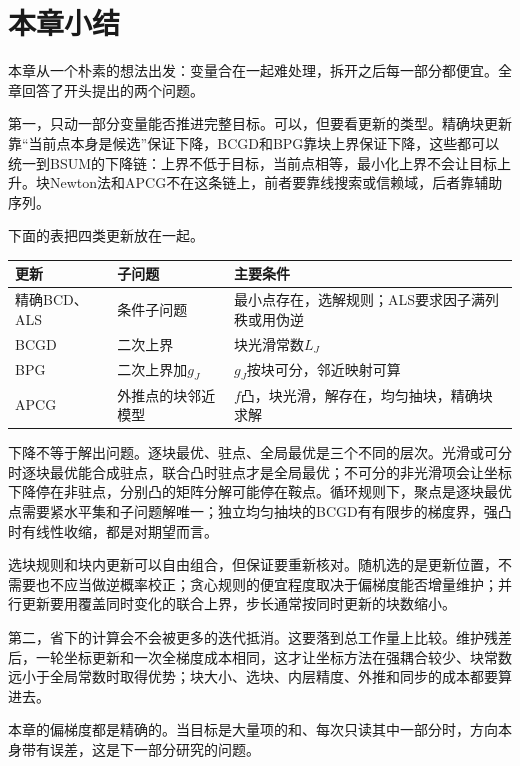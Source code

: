 \section{本章小结}
\label{sec:block-summary}

本章从一个朴素的想法出发：变量合在一起难处理，拆开之后每一部分都便宜。全章回答了开头提出的两个问题。

第一，只动一部分变量能否推进完整目标。可以，但要看更新的类型。精确块更新靠“当前点本身是候选”保证下降，BCGD和BPG靠块上界保证下降，这些都可以统一到BSUM的下降链：上界不低于目标，当前点相等，最小化上界不会让目标上升。块Newton法和APCG不在这条链上，前者要靠线搜索或信赖域，后者靠辅助序列。

下面的表把四类更新放在一起。

\begin{BookInlineTable}
\centering
\begin{tabular}{p{18mm}p{30mm}p{46mm}}
\toprule
更新 & 子问题 & 主要条件\\
\midrule
精确BCD、ALS & 条件子问题 & 最小点存在，选解规则；ALS要求因子满列秩或用伪逆\\
BCGD & 二次上界 & 块光滑常数$L_J$\\
BPG & 二次上界加$g_J$ & $g_J$按块可分，邻近映射可算\\
APCG & 外推点的块邻近模型 & $f$凸，块光滑，解存在，均匀抽块，精确块求解\\
\bottomrule
\end{tabular}
\end{BookInlineTable}

下降不等于解出问题。逐块最优、驻点、全局最优是三个不同的层次。光滑或可分时逐块最优能合成驻点，联合凸时驻点才是全局最优；不可分的非光滑项会让坐标下降停在非驻点，分别凸的矩阵分解可能停在鞍点。循环规则下，聚点是逐块最优点需要紧水平集和子问题解唯一；独立均匀抽块的BCGD有有限步的梯度界，强凸时有线性收缩，都是对期望而言。

选块规则和块内更新可以自由组合，但保证要重新核对。随机选的是更新位置，不需要也不应当做逆概率校正；贪心规则的便宜程度取决于偏梯度能否增量维护；并行更新要用覆盖同时变化的联合上界，步长通常按同时更新的块数缩小。

第二，省下的计算会不会被更多的迭代抵消。这要落到总工作量上比较。维护残差后，一轮坐标更新和一次全梯度成本相同，这才让坐标方法在强耦合较少、块常数远小于全局常数时取得优势；块大小、选块、内层精度、外推和同步的成本都要算进去。

本章的偏梯度都是精确的。当目标是大量项的和、每次只读其中一部分时，方向本身带有误差，这是下一部分研究的问题。
